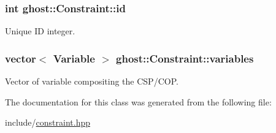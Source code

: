 \subsubsection[{\texorpdfstring{id}{id}}]{\setlength{\rightskip}{0pt plus 5cm}int ghost\+::\+Constraint\+::id\hspace{0.3cm}{\ttfamily [protected]}}\hypertarget{classghost_1_1Constraint_a5215df3cd5269adb4c5f6168191b9d47}{}\label{classghost_1_1Constraint_a5215df3cd5269adb4c5f6168191b9d47}


Unique ID integer. 

\subsubsection[{\texorpdfstring{variables}{variables}}]{\setlength{\rightskip}{0pt plus 5cm}vector$<$ {\bf Variable} $>$ ghost\+::\+Constraint\+::variables\hspace{0.3cm}{\ttfamily [protected]}}\hypertarget{classghost_1_1Constraint_aabd62a463f0004e9e79227d380cf0020}{}\label{classghost_1_1Constraint_aabd62a463f0004e9e79227d380cf0020}


Vector of variable compositing the C\+S\+P/\+C\+OP. 



The documentation for this class was generated from the following file\+:\begin{DoxyCompactItemize}
\item 
include/\hyperlink{constraint_8hpp}{constraint.\+hpp}\end{DoxyCompactItemize}
